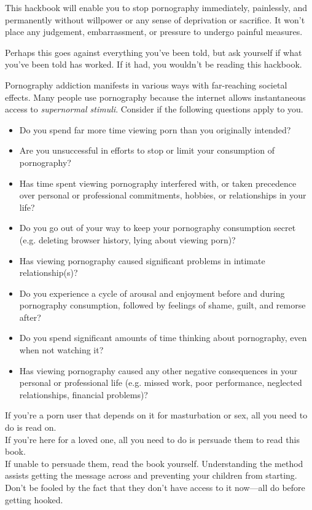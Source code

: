 \documentclass[easypeasy.tex]{subfiles}
\begin{document}
This hackbook will enable you to stop pornography immediately, painlessly, and permanently without willpower or any sense of deprivation or sacrifice. It won't place any judgement, embarrassment, or pressure to undergo painful measures.

Perhaps this goes against everything you've been told, but ask yourself if what you've been told has worked. If it had, you wouldn't be reading this hackbook.

Pornography addiction manifests in various ways with far-reaching societal effects. Many people use pornography because the internet allows instantaneous access to \textit{supernormal stimuli}. Consider if the following questions apply to you.

\begin{itemize}
  \item Do you spend far more time viewing porn than you originally intended?
  \item Are you unsuccessful in efforts to stop or limit your consumption of pornography?
  \item Has time spent viewing pornography interfered with, or taken precedence over personal or professional commitments, hobbies, or relationships in your life?
  \item Do you go out of your way to keep your pornography consumption secret (e.g. deleting browser history, lying about viewing porn)?
  \item Has viewing pornography caused significant problems in intimate relationship(s)?
  \item Do you experience a cycle of arousal and enjoyment before and during pornography consumption, followed by feelings of shame, guilt, and remorse after?
  \item Do you spend significant amounts of time thinking about pornography, even when not watching it?
  \item Has viewing pornography caused any other negative consequences in your personal or professional life (e.g. missed work, poor performance, neglected relationships, financial problems)?
\end{itemize}

If you're a porn user that depends on it for masturbation or sex, all you need to do is read on. \\
If you're here for a loved one, all you need to do is persuade them to read this book. \\
If unable to persuade them, read the book yourself. Understanding the method assists getting the message across and preventing your children from starting. Don't be fooled by the fact that they don't have access to it now—all do before getting hooked.
\end{document}
